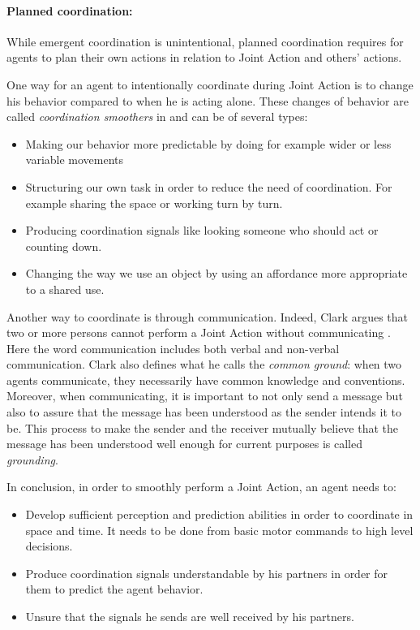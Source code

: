 \documentclass[english,a4paper,11pt,twoside]{StyleThese}
\begin{document}
\paragraph{Planned coordination:} 
While emergent coordination is unintentional, planned coordination requires for agents to plan their own actions in relation to Joint Action and others' actions.

One way for an agent to intentionally coordinate during Joint Action is to change his behavior compared to when he is acting alone. These changes of behavior are called \textit{coordination smoothers} in \cite{vesper2010minimal} and can be of several types:
\begin{itemize}
\item Making our behavior more predictable by doing for example wider or less variable movements
\item Structuring our own task in order to reduce the need of coordination. For example sharing the space or working turn by turn.
\item Producing coordination signals like looking someone who should act or counting down.
\item Changing the way we use an object by using an affordance more appropriate to a shared use.
\end{itemize}

Another way to coordinate is through communication. Indeed, Clark argues that two or more persons cannot perform a Joint Action without communicating \cite{clark1996using}. Here the word communication includes both verbal and non-verbal communication. Clark also defines what he calls the \textit{common ground}: when two agents communicate, they necessarily have common knowledge and conventions. Moreover, when communicating, it is important to not only send a message but also to assure that the message has been understood as the sender intends it to be. This process to make the sender and the receiver mutually believe that the message has been understood well enough for current purposes is called \textit{grounding}.

In conclusion, in order to smoothly perform a Joint Action, an agent needs to:
\begin{itemize}
\item Develop sufficient perception and prediction abilities in order to coordinate in space and time. It needs to be done from basic motor commands to high level decisions.
\item Produce coordination signals understandable by his partners in order for them to predict the agent behavior.
\item Unsure that the signals he sends are well received by his partners.
\end{itemize}
\end{document}
